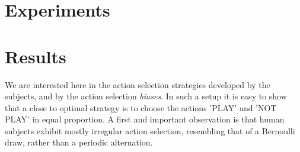 \documentclass[10pt,letterpaper]{article}
\begin{document}

%



\section{Experiments}


\section{Results}
We are interested here in the action selection strategies developed by the subjects, and by the action selection \emph{biases}. In such a setup it is easy to show that a close to optimal strategy is to choose the actions 'PLAY' and 'NOT PLAY' in equal proportion. A first and important observation is that human subjects exhibit mostly irregular action selection, resembling that of a Bernoulli draw, rather than a periodic alternation. %
\end{document}
